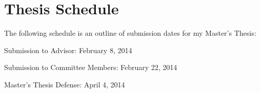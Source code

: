 \section{Thesis Schedule}
The following schedule is an outline of submission dates for my Master's Thesis:

Submission to Advisor: February 8, 2014

Submission to Committee Members: February 22, 2014

Master's Thesis Defense: April 4, 2014
